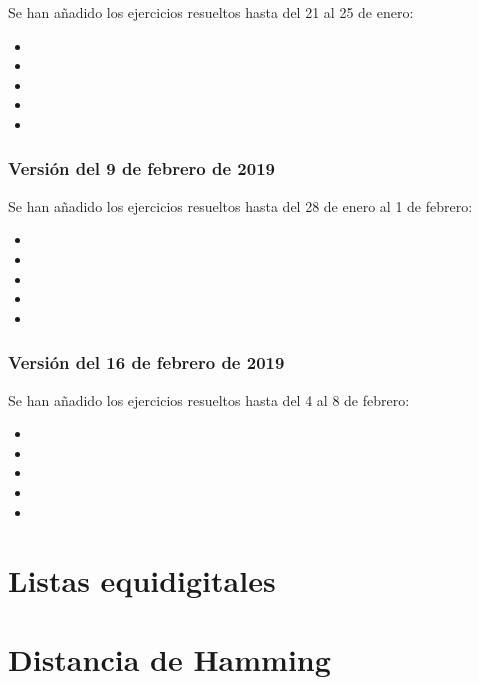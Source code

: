 \documentclass[a4paper,12pt,twoside]{book}
\begin{document}
Se han añadido los ejercicios resueltos hasta del 21 al 25 de enero:

\begin{itemize}
\item {}
\item {}
\item {}
\item {}
\item {}
\end{itemize}

\subsection*{Versión del 9 de febrero de 2019}

Se han añadido los ejercicios resueltos hasta del 28 de enero al 1 de
febrero:

\begin{itemize}
\item {}
\item {}
\item {}
\item {}
\item {}
\end{itemize}

\subsection*{Versión del 16 de febrero de 2019}

Se han añadido los ejercicios resueltos hasta del 4 al 8 de febrero:

\begin{itemize}
\item {}
\item {}
\item {}
\item {}
\item {}
\end{itemize}

\chapter{Listas equidigitales}

\chapter{Distancia de Hamming}
\end{document}
